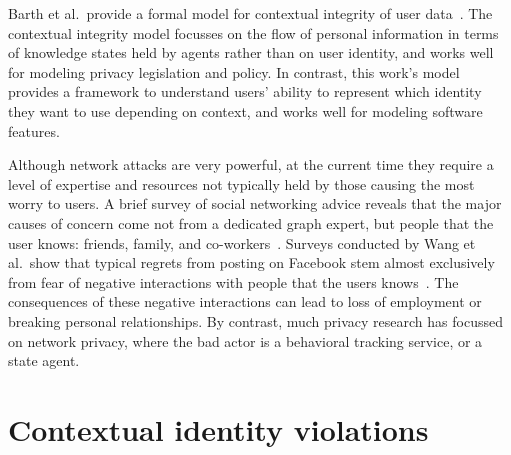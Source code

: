\documentclass{llncs}
\begin{document}
Barth et al.~provide a formal model for contextual integrity of user
data~\cite{barth}. The contextual integrity model focusses on the flow of
personal information in terms of knowledge states held by agents rather than on
user identity, and works well for modeling privacy legislation and policy. In
contrast, this work's model provides a framework to understand users' ability
to represent which identity they want to use depending on context, and works
well for modeling software features.

\begin{comment}TODO: figure out how to cite this. Why is this short
paper's model worth pursuing? It's simpler, and focusses on the user rather
than data.
\end{comment}

Although network attacks are very powerful, at the current time they require a
level of expertise and resources not typically held by those causing the most
worry to users. A brief survey of social networking advice reveals that the
major causes of concern come not from a dedicated graph expert, but people that
the user knows: friends, family, and co-workers~\cite{fbtips2,fbtips1}.
Surveys conducted by Wang et al.~show that typical regrets from posting on
Facebook stem almost exclusively from fear of negative interactions with people
that the users knows~\cite{wang}. The consequences of these negative
interactions can lead to loss of employment or breaking personal relationships.
By contrast, much privacy research has focussed on network privacy, where the
bad actor is a behavioral tracking service, or a state agent.

\section{Contextual identity violations}
\label{sec:examples}
\end{document}
